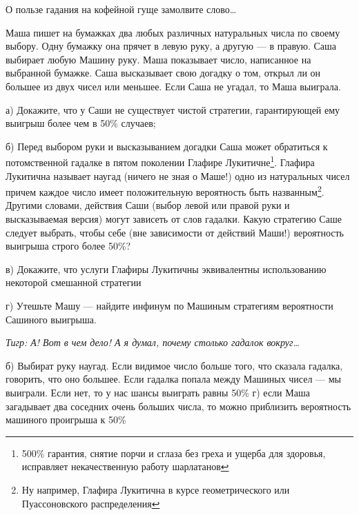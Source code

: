 \begin{problem}
 О пользе гадания на кофейной гуще замолвите слово\ldots \cite{winkler:gpdp} \par
Маша пишет на бумажках два любых различных натуральных числа по своему выбору. Одну бумажку она прячет в левую руку, а другую — в правую. Саша выбирает любую Машину руку. Маша показывает число, написанное на выбранной бумажке. Саша высказывает свою догадку о том, открыл ли он большее из двух чисел или меньшее. Если Саша не угадал, то Маша выиграла.\par
а) Докажите, что у Саши не существует чистой стратегии, гарантирующей ему выигрыш более чем в 50\% случаев;\par
б) Перед выбором руки и высказыванием догадки Саша может обратиться к потомственной гадалке в пятом поколении Глафире Лукитичне\footnote{500\% гарантия, снятие порчи и сглаза без греха и ущерба для здоровья, исправляет некачественную работу шарлатанов}. Глафира Лукитична называет наугад (ничего не зная о Маше!) одно из натуральных чисел причем каждое число имеет положительную вероятность быть названным\footnote{Ну например, Глафира Лукитична в курсе геометрического или Пуассоновского распределения}. Другими словами, действия Саши (выбор левой или правой руки и высказываемая версия) могут зависеть от слов гадалки. Какую стратегию Саше следует выбрать, чтобы  себе (вне зависимости от действий Маши!) вероятность выигрыша строго более 50\%?\par
в)      Докажите, что услуги Глафиры Лукитичны эквивалентны использованию некоторой смешанной стратегии\par
г)      Утешьте Машу — найдите инфинум по Машиным стратегиям вероятности Сашиного выигрыша.\par
{\it Тигр: А! Вот в чем дело! А я думал, почему столько гадалок вокруг\ldots }



\begin{sol}
б) Выбират руку наугад. Если видимое число больше того, что сказала гадалка, говорить, что оно большее. Если гадалка попала между Машиных чисел — мы выиграли. Если нет, то у нас шансы выиграть равны 50\% г) если Маша загадывает два соседних очень больших числа, то можно приблизить вероятность машиного проигрыша к 50\%
\end{sol}
\end{problem}



